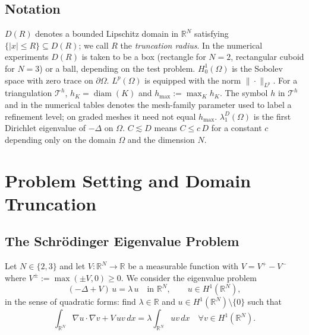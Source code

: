 \documentclass[11pt]{article}
\theoremstyle{plain}
\theoremstyle{definition}
\theoremstyle{remark}
\newcommand{\R}{\mathbb{R}}
\newcommand{\dx}{\,dx}
\DeclareMathOperator{\diam}{diam}
\begin{document}
\subsection*{Notation}

$D(R)$ denotes a bounded Lipschitz domain in $\R^N$ satisfying
$\{|x|\le R\}\subseteq D(R)$; we call $R$ the \emph{truncation radius}.
In the numerical experiments $D(R)$ is taken to be a box
(rectangle for $N=2$, rectangular cuboid for $N=3$) or a ball,
depending on the test problem.
$H^1_0(\Omega)$ is the Sobolev space with zero trace on $\partial\Omega$.
$L^p(\Omega)$ is equipped with the norm $\|\cdot\|_{L^p}$.
For a triangulation $\mathcal{T}^h$, $h_K = \diam(K)$ and
$h_{\max}:=\max_K h_K$.  The symbol $h$ in $\mathcal{T}^h$ and in the
numerical tables denotes the mesh-family parameter used to label a
refinement level; on graded meshes it need not equal $h_{\max}$.
$\lambda_1^D(\Omega)$ is the first Dirichlet eigenvalue of $-\Delta$
on $\Omega$.
$C \lesssim D$ means $C \le c\, D$ for a constant $c$ depending only on the domain $\Omega$ and the dimension $N$.

\section{Problem Setting and Domain Truncation}
\label{sec:setting}

\subsection{The Schrödinger Eigenvalue Problem}
\label{subsec:schrodinger}

Let $N \in \{2,3\}$ and let $V:\R^N\to\R$ be a measurable function
with $V = V^+ - V^-$ where $V^\pm := \max(\pm V,0) \ge 0$.
We consider the eigenvalue problem
\begin{equation}
\label{eq:evp-full}
  (-\Delta + V)\,u = \lambda\, u \quad \text{in } \R^N,
  \qquad u \in H^1(\R^N),
\end{equation}
in the sense of quadratic forms: find $\lambda \in \R$ and
$u \in H^1(\R^N) \setminus \{0\}$ such that
\begin{equation}
\label{eq:weak-full}
  \int_{\R^N} \nabla u \cdot \nabla v + V\,uv \dx
  = \lambda \int_{\R^N} uv \dx
  \quad \forall v \in H^1(\R^N).
\end{equation}
\end{document}
